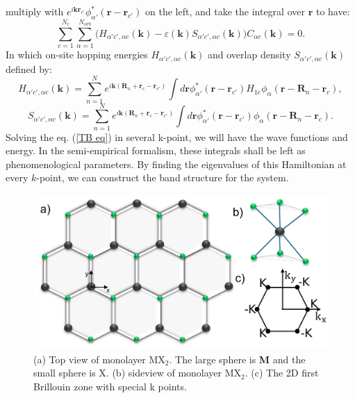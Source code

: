 \documentclass[12pt,english,a4paper]{article}
\begin{document}
	multiply with $e^{i\textbf{k}\textbf{r}_{c'}} \phi_{\alpha'}^* (\textbf{r}-\textbf{r}_{c'})$ on the left, and take the integral over $\textbf{r}$ to have:
	\begin{equation}
		\label{TB eq}
	\sum_{c=1}^{N_c} \sum_{\alpha = 1}^{N_{orb}}\big(H_{\alpha'c',\alpha c}(\textbf{k}) - \varepsilon(\textbf{k})S_{\alpha'c',\alpha c}(\textbf{k})\big) C_{\alpha c}(\textbf{k}) =0.
	\end{equation}
	In which on-site hopping energies $H_{\alpha'c',\alpha c}(\textbf{k})$ and overlap density $S_{\alpha'c',\alpha c}(\textbf{k})$ defined by:
	\begin{equation}
		H_{\alpha'c',\alpha c}(\textbf{k}) = \sum_{n=1}^N e^{i\textbf{k}(\textbf{R}_n +\textbf{r}_c -\textbf{r}_{c'})} \int d\textbf{r} \phi^*_{\alpha'}(\textbf{r}-\textbf{r}_{c'}) H_{1e} \phi_{\alpha}(\textbf{r}-\textbf{R}_n -\textbf{r}_c),
		\label{hopping energies}
	\end{equation}
	\begin{equation}
		S_{\alpha'c',\alpha c}(\textbf{k}) = \sum_{n=1}^N e^{i\textbf{k}(\textbf{R}_n +\textbf{r}_c -\textbf{r}_{c'})} \int d\textbf{r} \phi^*_{\alpha'}(\textbf{r}-\textbf{r}_{c'}) \phi_{\alpha}(\textbf{r}-\textbf{R}_n -\textbf{r}_c).
	\end{equation}
	\quad Solving the eq. (\ref{TB eq}) in several k-point, we will have the wave functions and energy. In the semi-empirical formalism, these integrals shall be left as phenomenological parameters. By finding the eigenvalues of this Hamiltonian at every $k$-point, we can construct the band structure for the system.
	
	\begin{figure}
		\begin{center}
			\includegraphics[width=0.5\linewidth]{Images/RS.pdf}
			\caption[TMD structure and its first Brillouin zone]{(a) Top view of monolayer $\mathrm{MX}_2$. The large sphere is \textbf{M} and the small sphere is X. (b) sideview of monolayer $\mathrm{MX}_2$. (c) The 2D first Brillouin zone with special k points.}
			\label{real space}
		\end{center}
	\end{figure}
\end{document}
